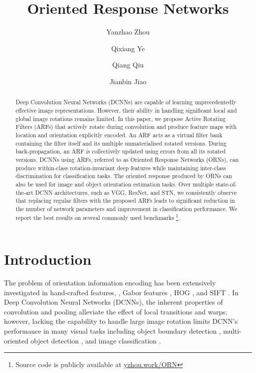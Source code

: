 \documentclass[10pt,twocolumn,letterpaper]{article}
\newcommand{\newfootnote}[2]{\footnote{\label{#1}#2}}
\begin{document}
\title{Oriented Response Networks}

\author[1]{Yanzhao Zhou}
\author[1]{Qixiang Ye}
\author[2]{Qiang Qiu}
\author[1]{Jianbin Jiao}


\renewcommand\Authands{ and }


\maketitle

\begin{abstract}
    Deep Convolution Neural Networks (DCNNs) are capable of learning unprecedentedly effective image representations.
    However, their ability in handling significant local and global image rotations remains limited.
    In this paper, we propose Active Rotating Filters (ARFs) that actively rotate during convolution and produce feature maps with location and orientation explicitly encoded.
    An ARF acts as a virtual filter bank containing the filter itself and its multiple unmaterialised rotated versions. During back-propagation, an ARF is collectively updated using errors from all its rotated versions.
    DCNNs using ARFs, referred to as Oriented Response Networks (ORNs), can produce within-class rotation-invariant deep features while maintaining inter-class discrimination for classification tasks.
    The oriented response produced by ORNs can also be used for image and object orientation estimation tasks.
    Over multiple state-of-the-art DCNN architectures, such as VGG, ResNet, and STN, we consistently observe that replacing regular filters with the proposed ARFs leads to significant reduction in the number of network parameters and improvement in classification performance.
    We report the best results on several commonly used benchmarks \newfootnote{fn:SourceCode}{Source code is publicly available at \href{http://yzhou.work/ORN/}{yzhou.work/ORN}}.
\end{abstract}

\section{Introduction}
    The problem of orientation information encoding has been extensively investigated in hand-crafted features, \eg, Gabor features \cite{Haley1995, Han2007}, HOG \cite{Dalal2005}, and SIFT \cite{Lowe1999}.
    In Deep Convolution Neural Networks (DCNNs), the inherent properties of convolution and pooling alleviate the effect of local transitions and warps; however, lacking the capability to handle large image rotation limits DCNN's performance in many visual tasks including object boundary detection \cite{Hallman2015, Maninis2016}, multi-oriented object detection \cite{Cheng2016}, and image classification \cite{Jaderberg2015, Laptev2016}.
\end{document}

